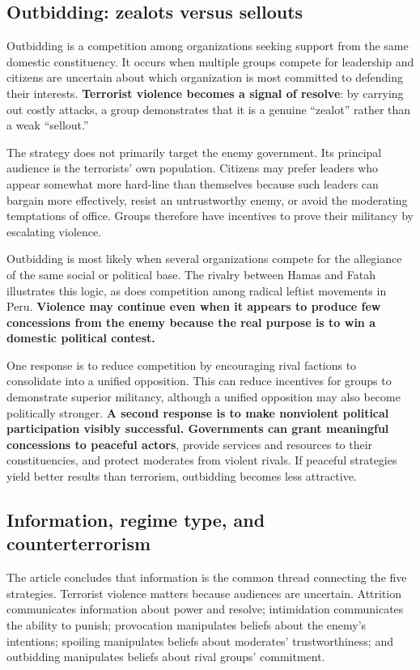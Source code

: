 \subsection{Outbidding: zealots versus sellouts}

Outbidding is a competition among organizations seeking support from the same domestic constituency. It occurs when multiple groups compete for leadership and citizens are uncertain about which organization is most committed to defending their interests. \textbf{Terrorist violence becomes a signal of resolve}: by carrying out costly attacks, a group demonstrates that it is a genuine ``zealot'' rather than a weak ``sellout.''

{The strategy does not primarily target the enemy government. Its principal audience is the terrorists' own population.} Citizens may prefer leaders who appear somewhat more hard-line than themselves because such leaders can bargain more effectively, resist an untrustworthy enemy, or avoid the moderating temptations of office. Groups therefore have incentives to prove their militancy by escalating violence.

Outbidding is most likely when several organizations compete for the allegiance of the same social or political base. The rivalry between Hamas and Fatah illustrates this logic, as does competition among radical leftist movements in Peru. \textbf{Violence may continue even when it appears to produce few concessions from the enemy because the real purpose is to win a domestic political contest.}

One response is to reduce competition by encouraging rival factions to consolidate into a unified opposition. This can reduce incentives for groups to demonstrate superior militancy, although a unified opposition may also become politically stronger. \textbf{A second response is to make nonviolent political participation visibly successful. Governments can grant meaningful concessions to peaceful actors}, provide services and resources to their constituencies, and protect moderates from violent rivals. If peaceful strategies yield better results than terrorism, outbidding becomes less attractive.

\subsection{Information, regime type, and counterterrorism}

The article concludes that information is the common thread connecting the five strategies. Terrorist violence matters because audiences are uncertain. Attrition communicates information about power and resolve; intimidation communicates the ability to punish; provocation manipulates beliefs about the enemy's intentions; spoiling manipulates beliefs about moderates' trustworthiness; and outbidding manipulates beliefs about rival groups' commitment.

